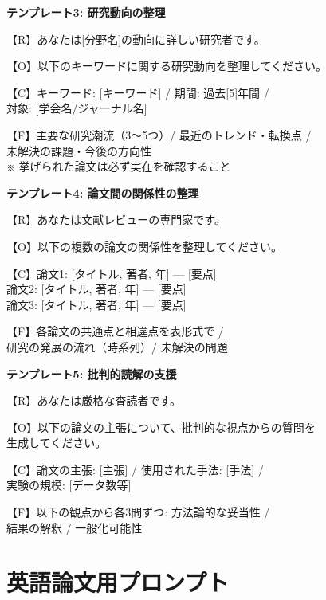 \begin{promptbox}
\textbf{テンプレート3: 研究動向の整理}

【R】あなたは[分野名]の動向に詳しい研究者です。

【O】以下のキーワードに関する研究動向を整理してください。

【C】キーワード: [キーワード] / 期間: 過去[5]年間 /\\
対象: [学会名/ジャーナル名]

【F】主要な研究潮流（3〜5つ）/ 最近のトレンド・転換点 /\\
未解決の課題・今後の方向性\\
※ 挙げられた論文は必ず実在を確認すること
\end{promptbox}

\begin{promptbox}
\textbf{テンプレート4: 論文間の関係性の整理}

【R】あなたは文献レビューの専門家です。

【O】以下の複数の論文の関係性を整理してください。

【C】論文1: [タイトル, 著者, 年] --- [要点]\\
論文2: [タイトル, 著者, 年] --- [要点]\\
論文3: [タイトル, 著者, 年] --- [要点]

【F】各論文の共通点と相違点を表形式で /\\
研究の発展の流れ（時系列）/ 未解決の問題
\end{promptbox}

\begin{promptbox}
\textbf{テンプレート5: 批判的読解の支援}

【R】あなたは厳格な査読者です。

【O】以下の論文の主張について、批判的な視点からの質問を\\
生成してください。

【C】論文の主張: [主張] / 使用された手法: [手法] /\\
実験の規模: [データ数等]

【F】以下の観点から各3問ずつ: 方法論的な妥当性 /\\
結果の解釈 / 一般化可能性
\end{promptbox}

\section{英語論文用プロンプト}

